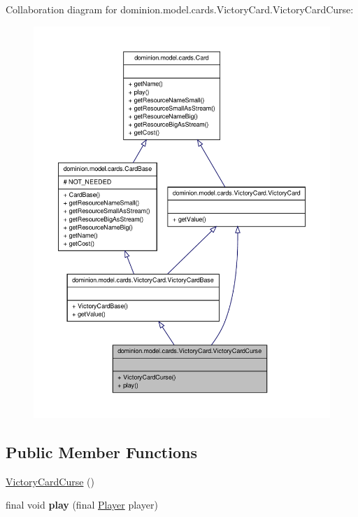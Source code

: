 \-Collaboration diagram for dominion.\-model.\-cards.\-Victory\-Card.\-Victory\-Card\-Curse\-:
\nopagebreak
\begin{figure}[H]
\begin{center}
\leavevmode
\includegraphics[width=350pt]{classdominion_1_1model_1_1cards_1_1VictoryCard_1_1VictoryCardCurse__coll__graph}
\end{center}
\end{figure}
\subsection*{\-Public \-Member \-Functions}
\begin{DoxyCompactItemize}
\item 
\hyperlink{classdominion_1_1model_1_1cards_1_1VictoryCard_1_1VictoryCardCurse_ab6ad7e091e00997ca269806b0dc608b0}{\-Victory\-Card\-Curse} ()
\item 
\hypertarget{classdominion_1_1model_1_1cards_1_1VictoryCard_1_1VictoryCardCurse_a0538597e20e5d7304ce7d1832e69b1cd}{final void {\bfseries play} (final \hyperlink{interfacedominion_1_1model_1_1Player}{\-Player} player)}\label{classdominion_1_1model_1_1cards_1_1VictoryCard_1_1VictoryCardCurse_a0538597e20e5d7304ce7d1832e69b1cd}

\end{DoxyCompactItemize}


